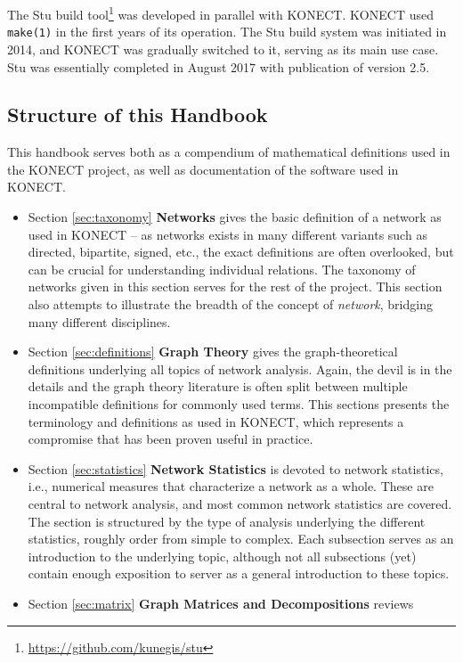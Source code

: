 \documentclass{article}
\begin{document}
The Stu build
tool\footnote{\href{https://github.com/kunegis/stu}{https://github.com/kunegis/stu}}
was developed in parallel with KONECT.  KONECT used \texttt{make(1)} in
the first years of its operation.  The Stu build system was initiated in
2014, and KONECT was gradually switched to it, serving as its main use
case.  Stu was essentially completed in August 2017 with publication of version 2.5. 

\subsection{Structure of this Handbook}
This handbook serves both as a compendium of mathematical definitions
used in the KONECT project, as well as documentation of the software
used in KONECT. 
\begin{itemize}
\item Section \ref{sec:taxonomy} \textbf{Networks} gives the basic
  definition of a network as used in KONECT -- as networks exists in
  many different variants such as directed, bipartite, signed, etc., the
  exact definitions are often overlooked, but can be crucial for
  understanding individual relations. The taxonomy of networks given in
  this section serves for the rest of the project.  This section also
  attempts to illustrate the breadth of the concept of \emph{network},
  bridging many different disciplines. 
\item Section \ref{sec:definitions} \textbf{Graph Theory} gives the
  graph-theoretical definitions underlying all topics of network analysis.  Again,
  the devil is in the details and the graph theory literature is often
  split between multiple incompatible definitions for commonly used
  terms.  This sections presents the terminology and definitions as used
  in KONECT, which represents a compromise that has been proven useful
  in practice. 
\item Section \ref{sec:statistics} \textbf{Network Statistics} is devoted to
  network statistics, i.e., numerical measures that characterize a
  network as a whole.  These are central to network analysis, and most
  common network statistics are covered.  The section is structured by
  the type of analysis underlying the different statistics, roughly
  order from simple to complex.  Each subsection serves as an
  introduction to the underlying topic, although not all subsections
  (yet) contain enough exposition to server as a general introduction to
  these topics. 
\item Section \ref{sec:matrix} \textbf{Graph Matrices and Decompositions} reviews

\end{itemize}
\end{document}
